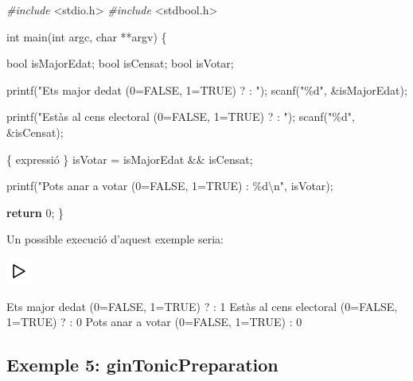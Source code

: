 \documentclass[]{book}
\newenvironment{Shaded}{\begin{snugshade}}{\end{snugshade}}
\newcommand{\ControlFlowTok}[1]{\textcolor[rgb]{0.13,0.29,0.53}{\textbf{#1}}}
\newcommand{\DataTypeTok}[1]{\textcolor[rgb]{0.13,0.29,0.53}{#1}}
\newcommand{\DecValTok}[1]{\textcolor[rgb]{0.00,0.00,0.81}{#1}}
\newcommand{\ImportTok}[1]{#1}
\newcommand{\NormalTok}[1]{#1}
\newcommand{\PreprocessorTok}[1]{\textcolor[rgb]{0.56,0.35,0.01}{\textit{#1}}}
\newcommand{\SpecialCharTok}[1]{\textcolor[rgb]{0.00,0.00,0.00}{#1}}
\newcommand{\StringTok}[1]{\textcolor[rgb]{0.31,0.60,0.02}{#1}}
\begin{document}
\begin{Shaded}
\begin{Highlighting}[]
\PreprocessorTok{\#include }\ImportTok{\textless{}stdio.h\textgreater{}}
\PreprocessorTok{\#include }\ImportTok{\textless{}stdbool.h\textgreater{}}

\DataTypeTok{int}\NormalTok{ main(}\DataTypeTok{int}\NormalTok{ argc, }\DataTypeTok{char}\NormalTok{ **argv) \{}

    \DataTypeTok{bool}\NormalTok{ isMajorEdat;}
    \DataTypeTok{bool}\NormalTok{ isCensat;}
    \DataTypeTok{bool}\NormalTok{ isVotar;}

\NormalTok{    printf(}\StringTok{"Ets major d\textquotesingle{}edat (0=FALSE, 1=TRUE) ? : "}\NormalTok{);}
\NormalTok{    scanf(}\StringTok{"\%d"}\NormalTok{, \&isMajorEdat);}

\NormalTok{    printf(}\StringTok{"Estàs al cens electoral (0=FALSE, 1=TRUE) ? : "}\NormalTok{);}
\NormalTok{    scanf(}\StringTok{"\%d"}\NormalTok{, \&isCensat);}

\NormalTok{    \{ expressió \}}
\NormalTok{    isVotar = isMajorEdat \&\& isCensat;}

\NormalTok{    printf(}\StringTok{"Pots anar a votar (0=FALSE, 1=TRUE) : \%d}\SpecialCharTok{\textbackslash{}n}\StringTok{"}\NormalTok{, isVotar);}

    \ControlFlowTok{return} \DecValTok{0}\NormalTok{;}
\NormalTok{\}}
\end{Highlighting}
\end{Shaded}

Un possible execució d'aquest exemple seria:

\includegraphics{./img/play.png}

\begin{Shaded}
\begin{Highlighting}[]
\NormalTok{Ets major d\textquotesingle{}edat (}\DecValTok{0}\NormalTok{=FALSE, }\DecValTok{1}\NormalTok{=TRUE) ? : }\DecValTok{1}
\NormalTok{Estàs al cens electoral (}\DecValTok{0}\NormalTok{=FALSE, }\DecValTok{1}\NormalTok{=TRUE) ? : }\DecValTok{0}
\NormalTok{Pots anar a votar (}\DecValTok{0}\NormalTok{=FALSE, }\DecValTok{1}\NormalTok{=TRUE) : }\DecValTok{0}
\end{Highlighting}
\end{Shaded}

\hypertarget{exemple-5-gintonicpreparation}{%
\subsection{Exemple 5: ginTonicPreparation}\label{exemple-5-gintonicpreparation}}
\end{document}
